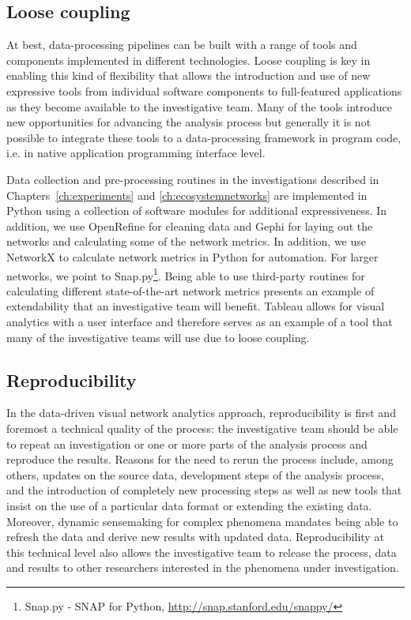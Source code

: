 \subsection{Loose coupling} 

At best, data-processing pipelines can be built with a range of tools and components implemented in different technologies. Loose coupling is key in enabling this kind of flexibility that allows the introduction and use of new expressive tools from individual software components to full-featured applications as they become available to the investigative team. Many of the tools introduce new opportunities for advancing the analysis process but generally it is not possible to integrate these tools to a data-processing framework in program code, i.e. in native application programming interface level.

Data collection and pre-processing routines in the investigations described in Chapters~\ref{ch:experiments} and \ref{ch:ecosystemnetworks} are implemented in Python using a collection of software modules for additional expressiveness. In addition, we use OpenRefine for cleaning data and Gephi for laying out the networks and calculating some of the network metrics. In addition, we use NetworkX to calculate network metrics in Python for automation. For larger networks, we point to Snap.py\footnote{Snap.py - SNAP for Python, \url{http://snap.stanford.edu/snappy/}}. Being able to use third-party routines for calculating different state-of-the-art network metrics presents an example of extendability that an investigative team will benefit. Tableau allows for visual analytics with a user interface and therefore serves as an example of a tool that many of the investigative teams will use due to loose coupling. 

\subsection{Reproducibility}

In the data-driven visual network analytics approach, reproducibility is first and foremost a technical quality of the process: the investigative team should be able to repeat an investigation or one or more parts of the analysis process and reproduce the results. Reasons for the need to rerun the process include, among others, updates on the source data, development steps of the analysis process, and the introduction of completely new processing steps as well as new tools that insist on the use of a particular data format or extending the existing data. Moreover, dynamic sensemaking for complex phenomena mandates being able to refresh the data and derive new results with updated data. Reproducibility at this technical level also allows the investigative team to release the process, data and results to other researchers interested in the phenomena under investigation.

